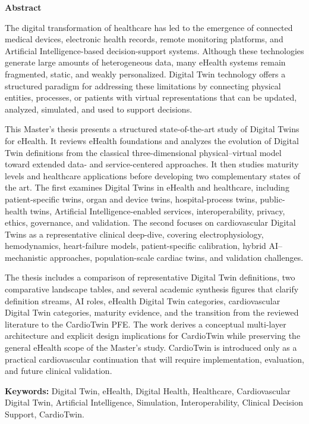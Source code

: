 \vspace*{4cm}
\begin{center}
    {\Huge\bfseries Abstract}
\end{center}
\vskip 1cm

{}

The digital transformation of healthcare has led to the emergence of connected medical devices, electronic health records, remote monitoring platforms, and Artificial Intelligence-based decision-support systems. Although these technologies generate large amounts of heterogeneous data, many eHealth systems remain fragmented, static, and weakly personalized. Digital Twin technology offers a structured paradigm for addressing these limitations by connecting physical entities, processes, or patients with virtual representations that can be updated, analyzed, simulated, and used to support decisions.

This Master’s thesis presents a structured state-of-the-art study of Digital Twins for eHealth. It reviews eHealth foundations and analyzes the evolution of Digital Twin definitions from the classical three-dimensional physical--virtual model toward extended data- and service-centered approaches. It then studies maturity levels and healthcare applications before developing two complementary states of the art. The first examines Digital Twins in eHealth and healthcare, including patient-specific twins, organ and device twins, hospital-process twins, public-health twins, Artificial Intelligence-enabled services, interoperability, privacy, ethics, governance, and validation. The second focuses on cardiovascular Digital Twins as a representative clinical deep-dive, covering electrophysiology, hemodynamics, heart-failure models, patient-specific calibration, hybrid AI--mechanistic approaches, population-scale cardiac twins, and validation challenges.

The thesis includes a comparison of representative Digital Twin definitions, two comparative landscape tables, and several academic synthesis figures that clarify definition streams, AI roles, eHealth Digital Twin categories, cardiovascular Digital Twin categories, maturity evidence, and the transition from the reviewed literature to the CardioTwin PFE. The work derives a conceptual multi-layer architecture and explicit design implications for CardioTwin while preserving the general eHealth scope of the Master’s study. CardioTwin is introduced only as a practical cardiovascular continuation that will require implementation, evaluation, and future clinical validation.

\textbf{Keywords:} Digital Twin, eHealth, Digital Health, Healthcare, Cardiovascular Digital Twin, Artificial Intelligence, Simulation, Interoperability, Clinical Decision Support, CardioTwin.

\clearpage
